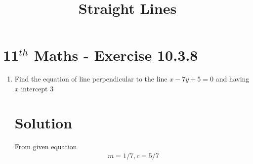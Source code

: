 \documentclass[12pt]{article}
\begin{document}
\begin{center}
\title{\textbf{Straight Lines}}
\date{\vspace{-5ex}} %
\maketitle
\end{center}
\setcounter{page}{1}
\section{11$^{th}$ Maths - Exercise 10.3.8}

\begin{enumerate}
\item Find the equation of line perpendicular to the line $x-7y+5=0$ and having $x$ intercept $3$\\
\section{Solution}From given equation 
\begin{align}
	m=1/7, c=5/7
\end{align}


\end{enumerate}
\end{document}
